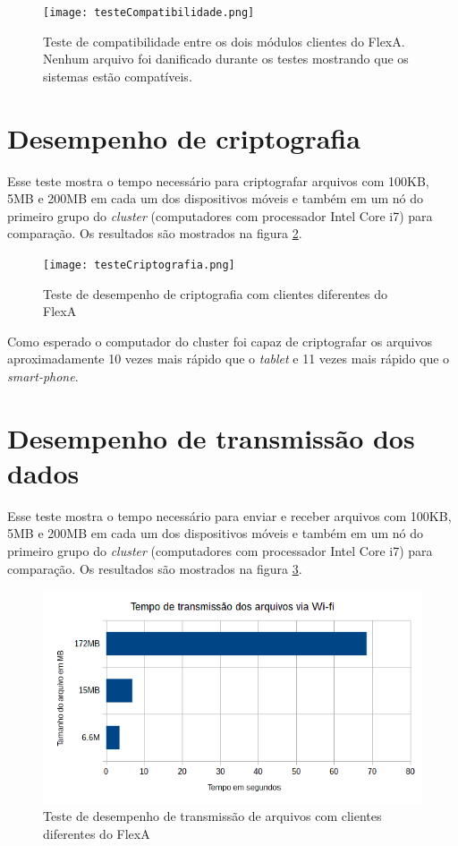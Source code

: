     \begin{figure}[!ht]
    \centering
    \texttt{[image: testeCompatibilidade.png]}
    \caption{Teste de compatibilidade entre os dois módulos clientes do FlexA. Nenhum arquivo foi danificado durante os testes mostrando que os sistemas estão compatíveis.}
    \label{fig:testeCompatibilidade}
    \end{figure}
    
\section{Desempenho de criptografia}

    Esse teste mostra o tempo necessário para criptografar arquivos com 100KB, 5MB e 200MB em cada um dos dispositivos móveis e também em um nó do primeiro grupo do \textit{cluster} (computadores com processador Intel Core i7) para comparação. Os resultados são mostrados na figura \ref{fig:testesCriptografia}.
    
    \begin{figure}[!ht]
    \centering
    \texttt{[image: testeCriptografia.png]}
    \caption{Teste de desempenho de criptografia com clientes diferentes do FlexA}
    \label{fig:testesCriptografia}
    \end{figure}
    
    Como esperado o computador do cluster foi capaz de criptografar os arquivos aproximadamente 10 vezes mais rápido que o \textit{tablet} e 11 vezes mais rápido que o \textit{smart-phone}.
    
\section{Desempenho de transmissão dos dados}

    Esse teste mostra o tempo necessário para enviar e receber arquivos com 100KB, 5MB e 200MB em cada um dos dispositivos móveis e também em um nó do primeiro grupo do \textit{cluster} (computadores com processador Intel Core i7) para comparação. Os resultados são mostrados na figura \ref{fig:testeTransmissao}.
    
    \begin{figure}[!ht]
    \centering
    \includegraphics[width=14cm]{testeTransmissao.png}
    \caption{Teste de desempenho de transmissão de arquivos com clientes diferentes do FlexA}
    \label{fig:testeTransmissao}
    \end{figure}
    
